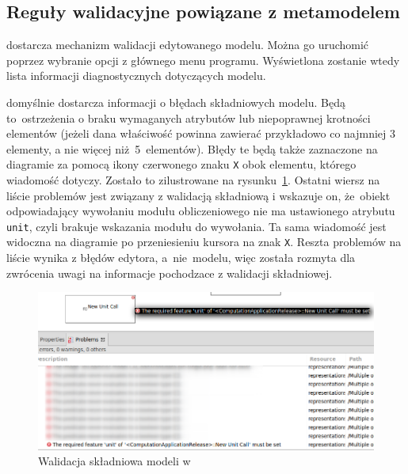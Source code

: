 \subsection{Reguły walidacyjne powiązane z
	metamodelem}\label{sec:reguly-walidacyjne-metamodel}

\SiriusDesktop{} dostarcza mechanizm walidacji edytowanego modelu. Można
go uruchomić poprzez wybranie opcji  z głównego menu
programu. Wyświetlona zostanie wtedy lista informacji diagnostycznych
dotyczących modelu.

\SiriusDesktop{} domyślnie dostarcza informacji o błędach składniowych
modelu. Będą to~ostrzeżenia o braku wymaganych atrybutów lub niepoprawnej
krotności elementów (jeżeli dana właściwość powinna zawierać przykładowo co
najmniej 3 elementy, a nie więcej niż~5~elementów). Błędy te będą także
zaznaczone na diagramie za pomocą ikony czerwonego znaku \texttt{X} obok
elementu, którego wiadomość dotyczy. Zostało to zilustrowane na
rysunku~\ref{rys:sirius-desktop-syntax-validation}.
Ostatni wiersz na liście problemów jest związany z walidacją składniową i
wskazuje on, że~obiekt odpowiadający wywołaniu modułu obliczeniowego nie ma
ustawionego atrybutu \texttt{unit}, czyli brakuje wskazania modułu do
wywołania. Ta sama wiadomość jest widoczna na diagramie po przeniesieniu
kursora na znak \texttt{X}.
Reszta problemów na liście wynika z błędów edytora, a~nie~modelu, więc została
rozmyta dla zwrócenia uwagi na informacje pochodzace z walidacji składniowej.

\begin{figure}[!hb]
	\centering

	\includegraphics[width=0.95\linewidth]{./images/sirius-desktop-syntax-validation.png}
	\caption{Walidacja składniowa modeli w \SiriusDesktop{}}\label{rys:sirius-desktop-syntax-validation}
\end{figure}

